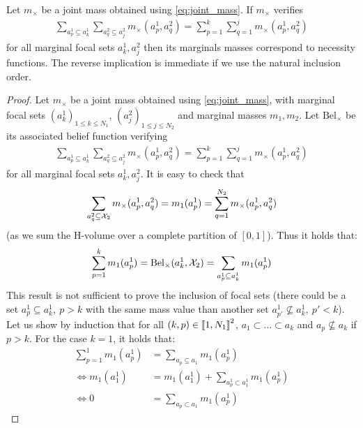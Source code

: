 \begin{proposition}
    Let $m_\times$ be a joint mass obtained using \eqref{eq:joint_mass}. If $m_\times$ verifies
    \begin{align*}
        \sum_{a^1_p\subseteq a_k^1}\sum_{a^2_q\subseteq a_j^2}m_\times(a^1_p, a^2_q) = \sum_{p=1}^k\sum_{q=1}^j m_\times(a^1_p, a^2_q)
    \end{align*}
    for all marginal focal sets $a^1_k,a^2_j$ then its marginals masses correspond to necessity functions. The reverse implication is immediate if we use the natural inclusion order.
\end{proposition}
\begin{proof}
    Let $m_\times$ be a joint mass obtained using \eqref{eq:joint_mass}, with marginal focal sets $(a^1_k)_{1\leqslant k\leqslant N_1}$, $(a^2_j)_{1\leqslant j\leqslant N_2}$ and marginal masses $m_1,m_2$. 
    Let $\mathrm{Bel}_\times$ be its associated belief function verifying
    \begin{align*}
        \sum_{a^1_p\subseteq a^1_k}\sum_{a^2_q\subseteq a_j^2}m_\times(a^1_p, a^2_q) = \sum_{p=1}^k\sum_{q=1}^j m_\times(a^1_p, a^2_q)
    \end{align*}
    for all marginal focal sets $a^1_k,a^2_j$. It is easy to check that
    \begin{align*}
        \sum_{a^2_q\subseteq {\mathcal{X}}_2}m_\times(a^1_p, a^2_q)=m_1(a^1_p)=\sum_{q=1}^{N_2}m_\times(a^1_p, a^2_q)    
    \end{align*}
    (as we sum the H-volume over a complete partition of $[0,1]$). Thus it holds that:
    \begin{align*}
        \sum_{p=1}^k m_1(a^1_p) = \mathrm{Bel}_\times(a^1_k,{\mathcal{X}}_2)=\sum_{a^1_p\subseteq a_k^1}m_1(a^1_p)
    \end{align*}
    This result is not sufficient to prove the inclusion of focal sets (there could be a set $a^1_p\subseteq a^1_k,~p>k$ with the same mass value than another set $a^1_{p'}\not\subseteq a^1_k,~p' < k$). Let us show by induction that for all $(k, p)\in{[\![}1,N_1{]\!]}^2$, $a_1\subset\dots\subset a_k$ and $a_p\not\subseteq a_k$ if $p>k$.
    For the case $k=1$, it holds that:
    \begin{align*}
        \sum_{p=1}^1m_1(a^1_p) &= \sum_{a_p\subseteq a_1}m_1(a^1_p)\\
        \Leftrightarrow m_1(a^1_1) &= m_1(a^1_1) + \sum_{a^1_p\subset a^1_1}m_1(a^1_p)\\
        \Leftrightarrow 0 &=\sum_{a_p\subset a_1}m_1(a^1_p)
    \end{align*}

\end{proof}
